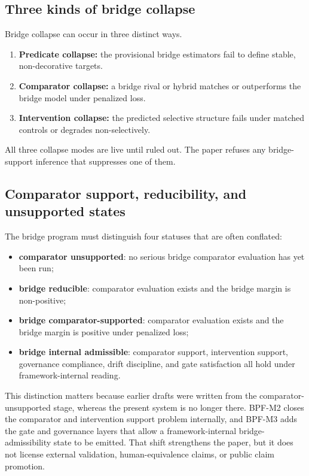 \documentclass[11pt,a4paper]{article}
\theoremstyle{definition}
\begin{document}
\subsection{Three kinds of bridge collapse}
Bridge collapse can occur in three distinct ways.
\begin{enumerate}[leftmargin=1.5em]
\item \textbf{Predicate collapse:} the provisional bridge estimators fail to define stable, non-decorative targets.
\item \textbf{Comparator collapse:} a bridge rival or hybrid matches or outperforms the bridge model under penalized loss.
\item \textbf{Intervention collapse:} the predicted selective structure fails under matched controls or degrades non-selectively.
\end{enumerate}
All three collapse modes are live until ruled out. The paper refuses any bridge-support inference that suppresses one of them.

\subsection{Comparator support, reducibility, and unsupported states}
The bridge program must distinguish four statuses that are often conflated:
\begin{itemize}[leftmargin=1.5em]
\item \textbf{comparator unsupported}: no serious bridge comparator evaluation has yet been run;
\item \textbf{bridge reducible}: comparator evaluation exists and the bridge margin is non-positive;
\item \textbf{bridge comparator-supported}: comparator evaluation exists and the bridge margin is positive under penalized loss;
\item \textbf{bridge internal admissible}: comparator support, intervention support, governance compliance, drift discipline, and gate satisfaction all hold under framework-internal reading.
\end{itemize}
This distinction matters because earlier drafts were written from the comparator-unsupported stage, whereas the present system is no longer there. BPF-M2 closes the comparator and intervention support problem internally, and BPF-M3 adds the gate and governance layers that allow a framework-internal bridge-admissibility state to be emitted. That shift strengthens the paper, but it does not license external validation, human-equivalence claims, or public claim promotion.
\end{document}
